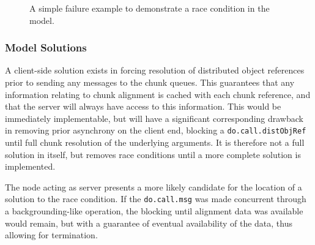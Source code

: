 \begin{figure}
	\centering
	\caption{\label{fig:counterex}A simple failure example to demonstrate a race condition in the model.}
\end{figure}

\subsubsection{Model Solutions}

A client-side solution exists in forcing resolution of distributed object
references prior to sending any messages to the chunk queues.
This guarantees that any information relating to chunk alignment is cached with
each chunk reference, and that the server will always have access to this
information.
This would be immediately implementable, but will have a significant
corresponding drawback in removing prior asynchrony on the client end, blocking
a \texttt{do.call.distObjRef} until full chunk resolution of the
underlying arguments.
It is therefore not a full solution in itself, but removes race conditions
until a more complete solution is implemented.

The node acting as server presents a more likely candidate for the location of
a solution to the race condition.
If the \texttt{do.call.msg} was made concurrent through a
backgrounding-like operation, the blocking until alignment data was available
would remain, but with a guarantee of eventual availability of the data, thus
allowing for termination.

